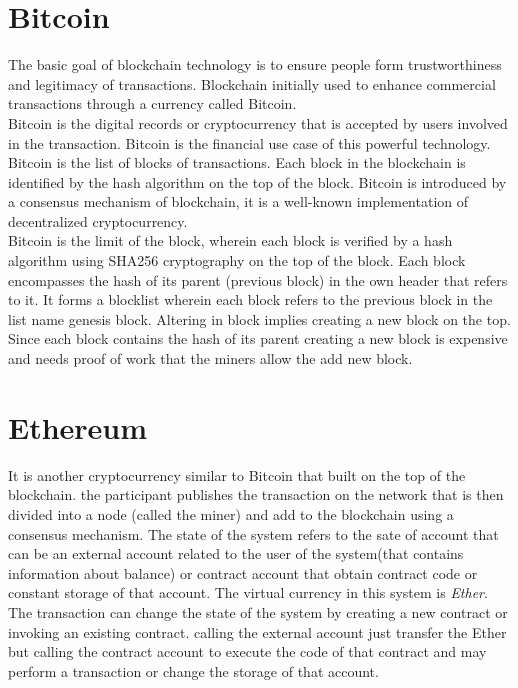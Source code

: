\section{Bitcoin} 
The basic goal of blockchain technology is to ensure people form trustworthiness and legitimacy of transactions. Blockchain initially used to enhance commercial transactions through a currency called Bitcoin. \\
Bitcoin is the digital records or cryptocurrency that is accepted by users involved in the transaction. Bitcoin is the financial use case of this powerful technology\cite{Panarello}.
Bitcoin is the list of blocks of transactions. Each block in the blockchain is identified by the hash algorithm on the top of the block.
Bitcoin is introduced by a consensus mechanism of blockchain, it is a well-known implementation of decentralized cryptocurrency.\\
Bitcoin is the limit of the block, wherein each block is verified by a hash algorithm using SHA256 cryptography on the top of the block. Each block encompasses the hash of its parent (previous block) in the own header that refers to it.
It forms a blocklist wherein each block refers to the previous block in the list name genesis block. Altering in block implies creating a new block on the top. Since each block contains the hash of its parent creating a new block is expensive and needs proof of work that the miners allow the add new block\cite{Pablo}.
\section{Ethereum}
It is another cryptocurrency similar to Bitcoin that built on the top of the blockchain. the participant publishes the transaction on the network that is then divided into a node (called the miner) and add to the blockchain using a consensus mechanism. The state of the system refers to the sate of account that can be an external account related to the user of the system(that contains information about balance) or contract account that obtain contract code or constant storage of that account. The virtual currency in this system is \textit{Ether}. The transaction can change the state of the system by creating a new contract or invoking an existing contract. calling the external account just transfer the Ether but calling the contract account to execute the code of that contract and may perform a transaction or change the storage of that account\cite{Ilya}.

